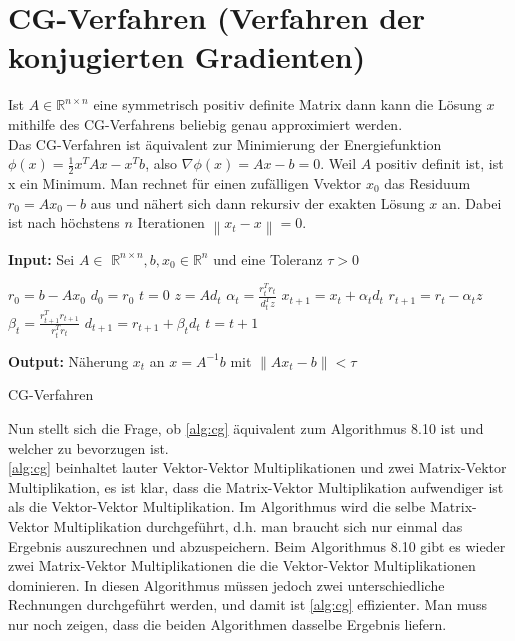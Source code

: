\documentclass[12pt,a4paper]{scrartcl}
\numberwithin{equation}{section}
\numberwithin{myalgctr}{section}
\numberwithin{mytheoremctr}{subsection}
\numberwithin{mykorollarctr}{subsection}
\numberwithin{mylemmactr}{subsection}
\numberwithin{mybeispielctr}{subsection}
\newcommand\norm[1]{\left\lVert#1\right\rVert}
\begin{document}
	\section{CG-Verfahren (Verfahren der konjugierten Gradienten)}
	
	Ist  $A\in\mathbb{R}^{n\times n}$ eine symmetrisch positiv definite Matrix dann kann die Lösung $x$ mithilfe des CG-Verfahrens beliebig genau approximiert werden.\\
	Das CG-Verfahren ist äquivalent zur Minimierung der Energiefunktion $\phi(x) = \frac{1}{2}x^{T}Ax - x^{T}b$, also $\nabla\phi(x) = Ax - b = 0$. Weil $A$ positiv definit ist, ist x ein Minimum. Man rechnet für einen zufälligen Vvektor $x_0$ das Residuum $r_0 = Ax_0 - b$ aus und nähert sich dann rekursiv der exakten Lösung $x$ an. Dabei ist nach höchstens $n$ Iterationen $\norm{x_t - x} = 0$.
	
	\begin{algorithm}[H]
		\textbf{Input:} Sei $A\in$ $\mathbb{R}^{n\times n}, b, x_0 \in \mathbb{R}^{n}$ und eine Toleranz $\tau > 0$
		\begin{algorithmic}[1]
			\State $r_0 = b - Ax_0$
			\State $d_0 = r_0$
			\State $t = 0$
			\While{$ \norm{r_t} > \tau $}
			\State $z = Ad_t$
			\State $\alpha_t = \frac{r_t^{T}r_t}{d_t^{T}z}$
			\State $x_{t+1} = x_{t} + \alpha_t d_t$
			\State $r_{t+1} = r_t - \alpha_t z$
			\State $\beta_t = \frac{r_{t+1}^{T}r_{t+1}}{r_t^{T}r_t}$
			\State $d_{t+1} = r_{t+1} + \beta_td_t$
			\State $t = t + 1$
			\EndWhile
		\end{algorithmic}
		\textbf{Output:} Näherung $x_t$ an $x = A^{-1}b$ mit $\norm{Ax_t-b} < \tau$
		
		\caption{CG-Verfahren} \label{alg:cg}
	\end{algorithm}
	
	 
	
		
	Nun stellt sich die Frage, ob \cref{alg:cg} äquivalent zum Algorithmus 8.10 \autocite[101]{skript} ist und welcher zu bevorzugen ist.\\
	\cref{alg:cg} beinhaltet lauter Vektor-Vektor Multiplikationen und zwei Matrix-Vektor Multiplikation, es ist klar, dass die Matrix-Vektor Multiplikation aufwendiger ist als die Vektor-Vektor Multiplikation. Im Algorithmus wird die selbe Matrix-Vektor Multiplikation durchgeführt, d.h. man braucht sich nur einmal das Ergebnis auszurechnen und abzuspeichern. Beim Algorithmus 8.10 gibt es wieder zwei Matrix-Vektor Multiplikationen die die Vektor-Vektor Multiplikationen dominieren. In diesen Algorithmus müssen jedoch zwei unterschiedliche Rechnungen durchgeführt werden, und damit ist \cref{alg:cg} effizienter. Man muss nur noch zeigen, dass die beiden Algorithmen dasselbe Ergebnis liefern.\\
	
\end{document}
